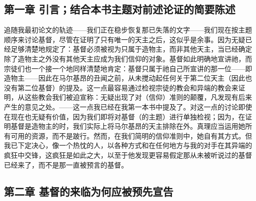 \par


\subsection{第一章 引言；结合本书主题对前述论证的简要陈述}

追随我最初论文的轨迹——我们正在稳步恢复那已失落的文字——我们现在按主题顺序来讨论基督，尽管在证明了只有唯一的天主之后，这似乎是余事。因为无疑已经足够清楚地规定了：基督必须被视为只属于造物主，而非其他天主，当已经确定除了造物主之外没有其他天主应成为我们信仰的对象。基督如此明确地宣讲祂，而宗徒们也一个接一个地同样清楚地肯定：基督只属于祂自己所宣讲的那一位——即造物主——因此在马尔基昂的丑闻之前，从未搅动起任何关于第二位天主（因此也没有第二位基督）的提及。这一点最容易通过检视宗徒的教会和异端的教会来证明，从这些教会我们被迫宣称：无疑出现了对（信仰）准则的颠覆，凡发现有后来产生的意见之处。——这一点我已经在我第一本书中提及了。对这一点的讨论即使在现在也无疑有价值，因为我们即将对基督（的主题）进行单独检视；因为，在证明基督是造物主的时，我们实际上将马尔基昂的天主排除在外。真理应当运用她所有可用的资源，而不是跛行。然而，在我们简明的信仰准则中，她自有其方式。但我已下定决心，像一个热忱的人，以各种方式和在任何地方与我的对手在其异端的疯狂中交锋，这疯狂是如此之大，以至于他发现更容易假定那从未被听说过的基督已经来了，而不是那一直被预言的基督。\par


\subsection{第二章 基督的来临为何应被预先宣告}

